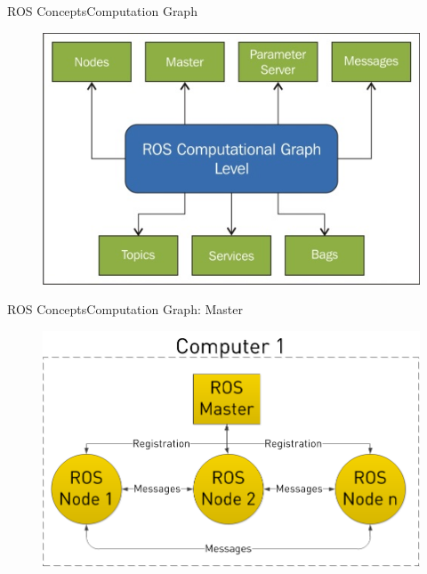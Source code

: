 \documentclass{beamer}
\begin{document}
\begin{frame}{ROS Concepts}{Computation Graph}
\begin{figure}
\centering
\includegraphics[scale=2]{figs/computaiongraph}
\end{figure}
  
\end{frame}
\begin{frame}{ROS Concepts}{Computation Graph: Master}
\begin{figure}
\centering
\includegraphics[scale=0.35]{figs/master}
\end{figure}

\end{frame}
\end{document}
